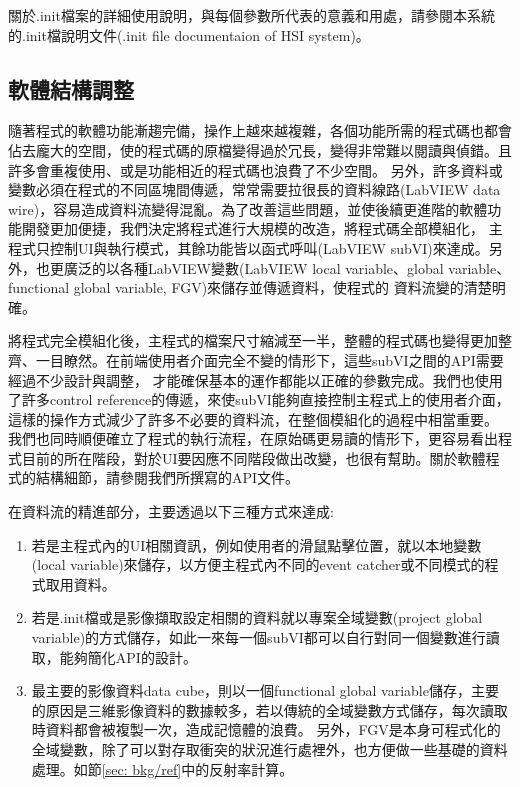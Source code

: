 \documentclass[12pt]{article}
\begin{document}
關於.init檔案的詳細使用說明，與每個參數所代表的意義和用處，請參閱本系統的.init檔說明文件(.init file documentaion of HSI system)。\cite{initDoc}

\subsection{軟體結構調整}
隨著程式的軟體功能漸趨完備，操作上越來越複雜，各個功能所需的程式碼也都會佔去龐大的空間，使的程式碼的原檔變得過於冗長，變得非常難以閱讀與偵錯。且許多會重複使用、或是功能相近的程式碼也浪費了不少空間。
另外，許多資料或變數必須在程式的不同區塊間傳遞，常常需要拉很長的資料線路(LabVIEW data wire)，容易造成資料流變得混亂。為了改善這些問題，並使後續更進階的軟體功能開發更加便捷，我們決定將程式進行大規模的改造，將程式碼全部模組化，
主程式只控制UI與執行模式，其餘功能皆以函式呼叫(LabVIEW subVI)來達成。另外，也更廣泛的以各種LabVIEW變數(LabVIEW local variable、global variable、functional global variable, FGV)來儲存並傳遞資料，使程式的
資料流變的清楚明確。

將程式完全模組化後，主程式的檔案尺寸縮減至一半，整體的程式碼也變得更加整齊、一目瞭然。在前端使用者介面完全不變的情形下，這些subVI之間的API需要經過不少設計與調整，
才能確保基本的運作都能以正確的參數完成。我們也使用了許多control reference的傳遞，來使subVI能夠直接控制主程式上的使用者介面，這樣的操作方式減少了許多不必要的資料流，在整個模組化的過程中相當重要。
我們也同時順便確立了程式的執行流程，在原始碼更易讀的情形下，更容易看出程式目前的所在階段，對於UI要因應不同階段做出改變，也很有幫助。關於軟體程式的結構細節，請參閱我們所撰寫的API文件。\cite{apiDoc}

在資料流的精進部分，主要透過以下三種方式來達成:
\begin{enumerate}
    \item 若是主程式內的UI相關資訊，例如使用者的滑鼠點擊位置，就以本地變數(local variable)來儲存，以方便主程式內不同的event catcher或不同模式的程式取用資料。
    \item 若是.init檔或是影像擷取設定相關的資料就以專案全域變數(project global variable)的方式儲存，如此一來每一個subVI都可以自行對同一個變數進行讀取，能夠簡化API的設計。
    \item 最主要的影像資料data cube，則以一個functional global variable儲存，主要的原因是三維影像資料的數據較多，若以傳統的全域變數方式儲存，每次讀取時資料都會被複製一次，造成記憶體的浪費。
          另外，FGV是本身可程式化的全域變數，除了可以對存取衝突的狀況進行處裡外，也方便做一些基礎的資料處理。如節\ref{sec: bkg/ref}中的反射率計算。
\end{enumerate}
\end{document}
